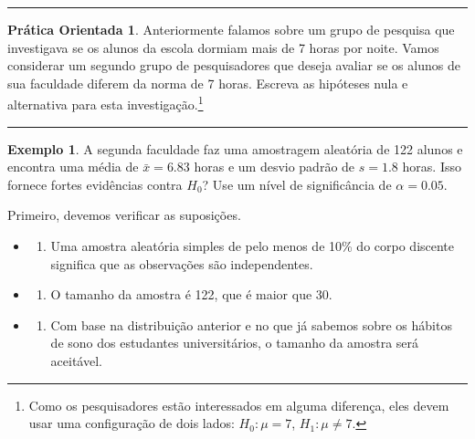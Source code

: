\documentclass[
]{book}
\providecommand{\tightlist}{%
  \setlength{\itemsep}{0pt}\setlength{\parskip}{0pt}}
\theoremstyle{definition}
\theoremstyle{definition}
\newtheorem{example}{Exemplo}[chapter]
\theoremstyle{definition}
\newtheorem{exercise}{Prática Orientada}[chapter]
\theoremstyle{definition}
\theoremstyle{remark}
\begin{document}
\begin{center}\rule{0.5\linewidth}{0.5pt}\end{center}

\begin{exercise}
\protect\hypertarget{exr:unnamed-chunk-171}{}{\label{exr:unnamed-chunk-171} }Anteriormente falamos sobre um grupo de pesquisa que investigava se os alunos da escola dormiam mais de 7 horas por noite. Vamos considerar um segundo grupo de pesquisadores que deseja avaliar se os alunos de sua faculdade diferem da norma de 7 horas. Escreva as hipóteses nula e alternativa para esta investigação.\footnote{Como os pesquisadores estão interessados em alguma diferença, eles devem usar uma configuração de dois lados: \(H_0: \mu = 7\), \(H_1: \mu \neq 7\).}
\end{exercise}

\begin{center}\rule{0.5\linewidth}{0.5pt}\end{center}

\begin{example}
\protect\hypertarget{exm:unnamed-chunk-172}{}{\label{exm:unnamed-chunk-172} }A segunda faculdade faz uma amostragem aleatória de 122 alunos e encontra uma média de \(\bar{x} = 6.83\) horas e um desvio padrão de \(s = 1.8\) horas. Isso fornece fortes evidências contra \(H_0\)? Use um nível de significância de \(\alpha=0.05\).
\end{example}

Primeiro, devemos verificar as suposições.

\begin{itemize}
\item
  \begin{enumerate}
  \def\labelenumi{(\arabic{enumi})}
  \tightlist
  \item
    Uma amostra aleatória simples de pelo menos de 10\% do corpo discente significa que as observações são independentes.
  \end{enumerate}
\item
  \begin{enumerate}
  \def\labelenumi{(\arabic{enumi})}
  \setcounter{enumi}{1}
  \tightlist
  \item
    O tamanho da amostra é 122, que é maior que 30.
  \end{enumerate}
\item
  \begin{enumerate}
  \def\labelenumi{(\arabic{enumi})}
  \setcounter{enumi}{2}
  \tightlist
  \item
    Com base na distribuição anterior e no que já sabemos sobre os hábitos de sono dos estudantes universitários, o tamanho da amostra será aceitável.
  \end{enumerate}
\end{itemize}
\end{document}
